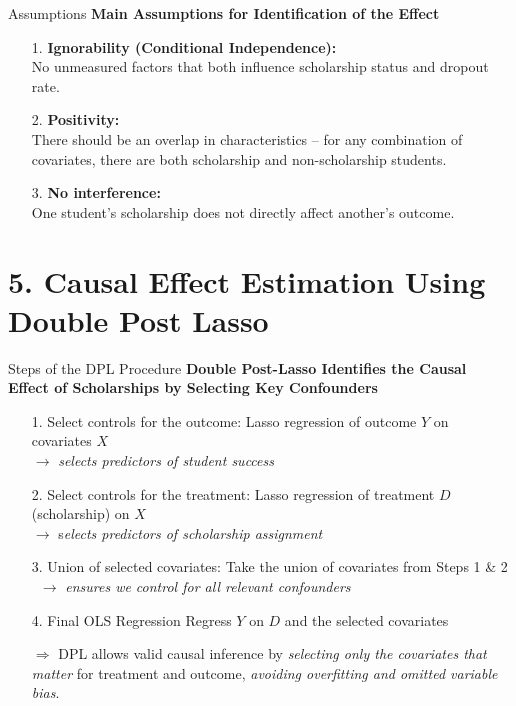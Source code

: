 \documentclass[aspectratio=169]{beamer}
\begin{document}
\begin{frame}{Assumptions}
\textbf{Main Assumptions for Identification of the Effect}
\begin{itemize}
    \item [1.] \textbf{Ignorability (Conditional Independence):} \\No unmeasured factors that both influence scholarship status and dropout rate.
    \item [2.] \textbf{Positivity:} \\There should be an overlap in characteristics – for any combination of covariates, there are both scholarship and non-scholarship students.
    \item [3.] \textbf{No interference:} \\One student’s scholarship does not directly affect another’s outcome.
\end{itemize}

\end{frame}


\section{5. Causal Effect Estimation Using Double Post Lasso}

\begin{frame}{Steps of the DPL Procedure}
\textbf{Double Post-Lasso Identifies the Causal Effect of Scholarships by Selecting Key Confounders}

\begin{itemize}
	\item[1.] Select controls for the outcome: Lasso regression of outcome $Y$ on covariates $X$ \\$\rightarrow$ \textit{selects predictors of student success}
	\item[2.] Select controls for the treatment: Lasso regression of treatment $D$ (scholarship) on $X$ \\ $\rightarrow$ s\textit{elects predictors of scholarship assignment}
	\item[3.] Union of selected covariates: Take the union of covariates from Steps 1 \& 2 \\ $\rightarrow$ \textit{ensures we control for all relevant confounders}
	\item[4.] Final OLS Regression Regress $Y$ on $D$ and the selected covariates
\end{itemize}

\begin{itemize}
	\item[$\Rightarrow$] DPL allows valid causal inference by \textit{selecting only the covariates that matter} for treatment and outcome, \textit{avoiding overfitting and omitted variable bias}.
\end{itemize}
\vspace{-10pt}
\end{frame}
\end{document}
